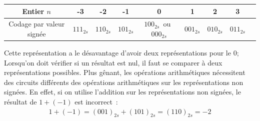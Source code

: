 \begin{center}
\begin{tabular}{c|c|c|c|c|c|c|c|c}
Entier $n$ & -3 & -2& -1 & 0 & 1 & 2 & 3 \\
\hline
Codage par valeur signée & $111_{2s}$ & $110_{2s}$ & $101_{2s}$ & $100_{2s}$\mbox{ ou } $000_{2s}$ & $001_{2s}$ & $010_{2s}$ & $011_{2s}$
\end{tabular}
\end{center}

Cette représentation a le désavantage d'avoir deux représentations pour le $0$; Lorsqu'on doit vérifier si un résultat est nul, il faut se comparer à deux représentations possibles. Plus gênant, les opérations arithmétiques nécessitent des circuits différents des opérations arithmétiques sur les représentations non signées. En effet, si on utilise l'addition sur les représentations non signées, le résultat de $1 + (-1)$ est incorrect~:
\begin{eqnarray*}
1 + (-1) = (001)_{2s} + (101)_{2s} = (110)_{2s} = -2
\end{eqnarray*}






